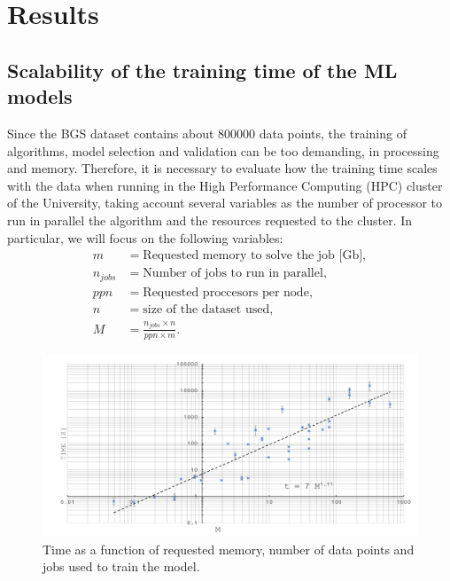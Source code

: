 \chapter{Results}

\section{Scalability of the training time of the ML models} %

Since the BGS dataset contains about 800000 data points, the training of algorithms, model selection and validation can be too demanding, in processing and memory. Therefore, it is necessary to evaluate how the training time scales with the data when running in the High Performance Computing (HPC) cluster of the University, taking account several variables as the number of processor to run in parallel the algorithm and the resources requested to the cluster. In particular, we will focus on the following variables:
\begin{align*}
m &= \text{Requested memory to solve the job [Gb]},\\
n_{jobs} &= \text{Number of jobs to run in parallel},\\
ppn &= \text{Requested proccesors per node},\\
n &= \text{size of the dataset used},\\
M &= \frac{n_{jobs} \times n}{ppn \times m}.
\end{align*}
\begin{figure}[ht!]
	\centering
	\includegraphics[width=1.0\linewidth]{TeX_files/Imagenes/hpc_results}
	\caption{Time as a function of requested memory, number of data points and jobs used to train the model.}
	\label{fig:hpcresults}
\end{figure}

